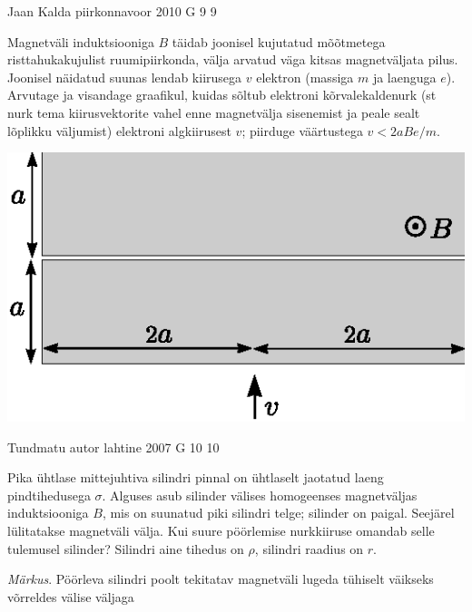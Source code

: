 \documentclass[11pt]{article}
\begin{document}
{%
{Jaan Kalda} %
{piirkonnavoor} %
{2010} %
{G 9} %
{9} %
{
\ifStatement
Magnetväli induktsiooniga $B$ täidab joonisel kujutatud mõõtmetega risttahukakujulist ruumipiirkonda, välja arvatud väga kitsas magnetväljata pilus.
Joonisel näidatud suunas lendab kiirusega $v$ elektron (massiga $m$ ja laenguga $e$). Arvutage ja visandage graafikul, kuidas sõltub elektroni kõrvalekaldenurk (st nurk tema kiirusvektorite vahel enne magnetvälja sisenemist ja peale sealt lõplikku väljumist) elektroni algkiirusest $v$; piirduge väärtustega $v<2aBe/m$.
\begin{center}
\includegraphics[width=0.5\linewidth]{2010-v2g-09-elektron.eps}
\end{center}
\fi
}

{Tundmatu autor} %
{lahtine} %
{2007} %
{G 10} %
{10} %
{
\ifStatement
Pika ühtlase mittejuhtiva silindri pinnal on ühtlaselt jaotatud laeng pindtihedusega $\sigma$. Alguses asub silinder välises homogeenses magnetväljas induktsiooniga $B$, mis on suunatud piki silindri telge; silinder on paigal. Seejärel lülitatakse magnetväli välja. Kui suure pöörlemise nurkkiiruse omandab selle tulemusel silinder? Silindri aine tihedus on $\rho$, silindri raadius on $r$. 

\emph{Märkus}. Pöörleva silindri poolt tekitatav magnetväli lugeda tühiselt väikseks võrreldes välise väljaga
\fi
}
\newpage\subsection{\protect{}}

}
\end{document}
